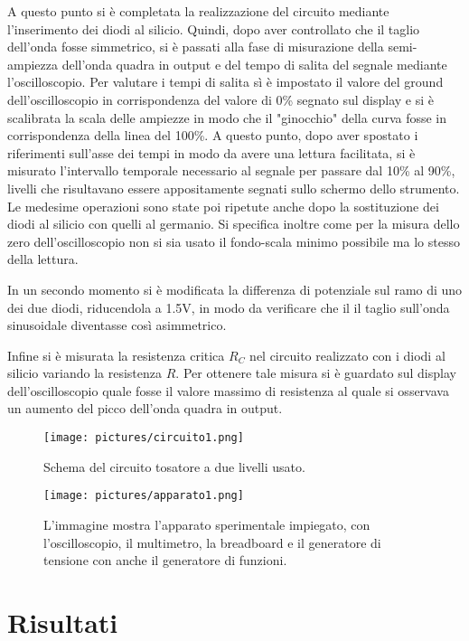 \documentclass[a4paper,11pt]{article}
\begin{document}
	A questo punto si è completata la realizzazione del circuito mediante l'inserimento dei diodi al silicio. Quindi, dopo aver controllato che il taglio dell'onda fosse simmetrico, si è passati alla fase di misurazione della semi-ampiezza dell'onda quadra in output e del tempo di salita del segnale mediante l'oscilloscopio. Per valutare i tempi di salita sì è impostato il valore del ground dell'oscilloscopio in corrispondenza del valore di 0\% segnato sul display e si è scalibrata la scala delle ampiezze in modo che il "ginocchio" della curva fosse in corrispondenza della linea del 100\%. A questo punto, dopo aver spostato i riferimenti sull'asse dei tempi in modo da avere una lettura facilitata, si è misurato l'intervallo temporale necessario al segnale per passare dal 10\% al 90\%, livelli che risultavano essere appositamente segnati sullo schermo dello strumento. Le medesime operazioni sono state poi ripetute anche dopo la sostituzione dei diodi al silicio con quelli al germanio. Si specifica inoltre come per la misura dello zero dell'oscilloscopio non si sia usato il fondo-scala minimo possibile ma lo stesso della lettura.
	
	In un secondo momento si è modificata la differenza di potenziale sul ramo di uno dei due diodi, riducendola a 1.5V, in modo da verificare che il il taglio sull'onda sinusoidale diventasse così asimmetrico.
	
	Infine si è misurata la resistenza critica $R_C$ nel circuito realizzato con i diodi al silicio variando la resistenza $R$. Per ottenere tale misura si è guardato sul display dell'oscilloscopio quale fosse il valore massimo di resistenza al quale si osservava un aumento del picco dell'onda quadra in output.
	
	
	\begin{figure}
		\centering
		\texttt{[image: pictures/circuito1.png]}
		\caption{Schema del circuito tosatore a due livelli usato.}
		\label{fig:circuito}
	\end{figure}
	
	\begin{figure}
		\centering
		\texttt{[image: pictures/apparato1.png]}
		\caption{L'immagine mostra l'apparato sperimentale impiegato, con l'oscilloscopio, il multimetro, la breadboard e il generatore di tensione con anche il generatore di funzioni. }
		\label{fig:apparato}
	\end{figure}
	
	\FloatBarrier
	\section{Risultati}
	
\end{document}
